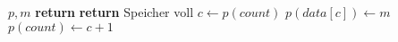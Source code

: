 \begin{algorithm}[!ht]
\caption{}
\label{alg:markerpool-addmarker}
\begin{algorithmic}[1]
	\Require $p,m$
		\State \textbf{return}
	\EndIf
		\State \textbf{return} \Comment Speicher voll
	\EndIf
	\State $c \gets p(\mathit{count})$
	\State $p(\mathit{data}[c]) \gets m$
	\State $p(\mathit{count}) \gets c + 1$
\end{algorithmic}
\end{algorithm}

